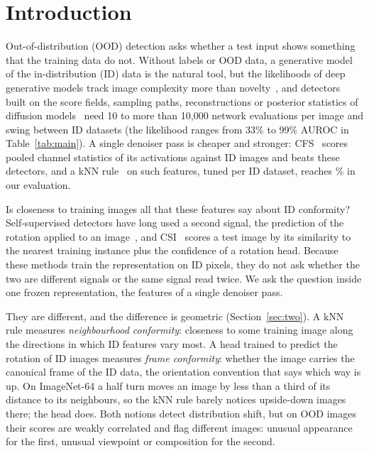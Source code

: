 \documentclass{article}
\begin{document}
\section{Introduction}
\label{sec:intro}
Out-of-distribution (OOD) detection asks whether a test input shows something that the training data do not. Without labels or OOD data, a generative model of the in-distribution (ID) data is the natural tool, but the likelihoods of deep generative models track image complexity more than novelty~\cite{nalisnick2019deep,serra2020input}, and detectors built on the score fields, sampling paths, reconstructions or posterior statistics of diffusion models~\cite{mahmood2021msma,graham2023ddpmood,liu2023lmd,heng2024diffpath,kamkari2024geometric,alexis2026gepc,shoushtari2026eigenscore} need 10 to more than 10{,}000 network evaluations per image and swing between ID datasets (the likelihood ranges from 33\% to 99\% AUROC in Table~\ref{tab:main}). A single denoiser pass is cheaper and stronger: CFS~\cite{rouzoumka2026cfs} scores pooled channel statistics of its activations against ID images and beats these detectors, and a kNN rule~\cite{sun2022knn} on such features, tuned per ID dataset, reaches \tunedMean\% in our evaluation.

Is closeness to training images all that these features say about ID conformity? Self-supervised detectors have long used a second signal, the prediction of the rotation applied to an image~\cite{golan2018geometric,hendrycks2019ss}, and CSI~\cite{tack2020csi} scores a test image by its similarity to the nearest training instance plus the confidence of a rotation head. Because these methods train the representation on ID pixels, they do not ask whether the two are different signals or the same signal read twice. We ask the question inside one frozen representation, the features of a single denoiser pass.

They are different, and the difference is geometric (Section~\ref{sec:two}). A kNN rule measures \emph{neighbourhood conformity}: closeness to some training image along the directions in which ID features vary most. A head trained to predict the rotation of ID images measures \emph{frame conformity}: whether the image carries the canonical frame of the ID data, the orientation convention that says which way is up. On ImageNet-64 a half turn moves an image by less than a third of its distance to its neighbours, so the kNN rule barely notices upside-down images there; the head does. Both notions detect distribution shift, but on OOD images their scores are weakly correlated and flag different images: unusual appearance for the first, unusual viewpoint or composition for the second.
\end{document}
